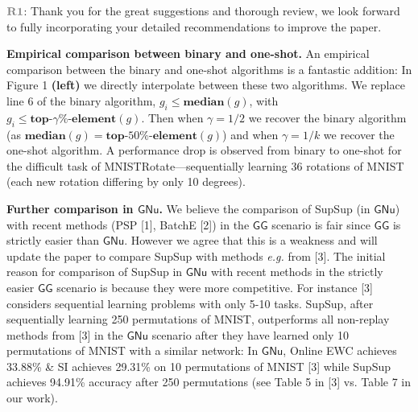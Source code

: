 \documentclass{article}
\newcommand{\qu}[1]{\textit{#1}}
\newcommand{\casename}[1]{\ensuremath{\mathsf{#1}}\xspace}
\newcommand{\rone}{\textbf{\textcolor{cl11}{R1}}}
\newcommand{\rtwo}{\textbf{{\textcolor{cl6}{R2}}}}
\newcommand{\rthree}{\textbf{{\textcolor{cl10}{R3}}}}
\begin{document}
\noindent \textbf{\textcolor{cl11}{\textbullet}} $\rone$: Thank you for the great suggestions and thorough review, we look forward to fully incorporating your detailed recommendations to improve the paper.

\textbf{Empirical comparison between binary and one-shot.} An empirical comparison between the binary and one-shot algorithms is a fantastic addition: In Figure 1 \textbf{(left)} we directly interpolate between these two algorithms. We replace line 6 of the binary algorithm, $g_i \leq {\textbf{median}(g)}$, with $g_i \leq {\textbf{top-}\gamma\%\textbf{-element}(g)}$. Then when $\gamma=1/2$ we recover the binary algorithm (as $\textbf{median}(g) = \textbf{top-}50\%\textbf{-element}(g)$) and when $\gamma=1/k$ we recover the one-shot algorithm. A performance drop is observed from binary to one-shot for the difficult task of MNISTRotate---sequentially learning 36 rotations of MNIST (each new rotation differing by only 10 degrees).

\textbf{Further comparison in \casename{GNu}.} We believe the comparison of SupSup (in \casename{GNu}) with recent methods (PSP [1], BatchE [2]) in the \casename{GG} scenario is fair since \casename{GG} is strictly easier than \casename{GNu}. However we agree that this is a weakness and will update the paper to compare SupSup with methods \textit{e.g.} from [3]. The initial reason for comparison of SupSup in \casename{GNu} with recent methods in the strictly easier \casename{GG} scenario is because they were more competitive. For instance [3] considers sequential learning problems with only 5-10 tasks. SupSup, after sequentially learning 250 permutations of MNIST, outperforms all non-replay methods from [3] in the \casename{GNu} scenario after they have learned only 10 permutations of MNIST with a similar network: In \casename{GNu}, Online EWC achieves 33.88\% \& SI achieves 29.31\% on 10 permutations of MNIST [3] while SupSup achieves 94.91\% accuracy after 250 permutations (see Table 5 in [3] vs. Table 7 in our work). 
\end{document}
